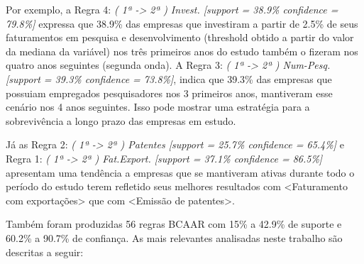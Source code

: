 \documentclass[kdmile,a4paper]{kdmile} %
\begin{document}
Por exemplo, a Regra 4: \textit{( 1ª -> 2ª ) Invest. [support = 38.9\% confidence = 79.8\%]} expressa que 38.9\% das empresas que investiram a partir de 2.5\% de seus faturamentos em pesquisa e desenvolvimento (threshold obtido a partir do valor da mediana da variável) nos três primeiros anos do estudo também o fizeram nos quatro anos seguintes (segunda onda). A Regra 3: \textit{( 1ª -> 2ª ) Num-Pesq. [support = 39.3\% confidence = 73.8\%]}, indica que 39.3\% das empresas que possuiam empregados pesquisadores nos 3 primeiros anos, mantiveram esse cenário nos 4 anos seguintes. Isso pode mostrar uma estratégia para a sobrevivência a longo prazo das empresas em estudo. 

Já as Regra 2: \textit{( 1ª -> 2ª ) Patentes [support = 25.7\% confidence = 65.4\%]} e Regra 1: \textit{( 1ª -> 2ª ) Fat.Export. [support = 37.1\% confidence = 86.5\%]} apresentam uma tendência a empresas que se mantiveram ativas durante todo o período do estudo terem refletido seus melhores resultados com <Faturamento com exportações> que com <Emissão de patentes>.

Também foram produzidas 56 regras BCAAR com 15\% a 42.9\% de suporte e 60.2\% a 90.7\% de confiança. As mais relevantes analisadas neste trabalho são descritas a seguir:
\end{document}
